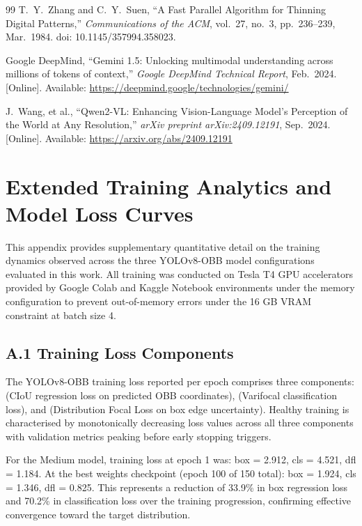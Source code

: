 \documentclass[12pt,a4paper]{report}
\begin{document}
\begin{thebibliography}{99}
T.~Y.~Zhang and C.~Y.~Suen,
``A Fast Parallel Algorithm for Thinning Digital Patterns,''
\textit{Communications of the ACM}, vol.~27, no.~3, pp.~236--239, Mar.~1984.
doi: 10.1145/357994.358023.

Google DeepMind,
``Gemini 1.5: Unlocking multimodal understanding across millions of tokens of context,''
\textit{Google DeepMind Technical Report}, Feb.~2024.
[Online]. Available: \url{https://deepmind.google/technologies/gemini/}

J.~Wang, et al.,
``Qwen2-VL: Enhancing Vision-Language Model's Perception of the World at Any Resolution,''
\textit{arXiv preprint arXiv:2409.12191}, Sep.~2024.
[Online]. Available: \url{https://arxiv.org/abs/2409.12191}

\end{thebibliography}


\appendix
\chapter{Extended Training Analytics and Model Loss Curves}
\label{app:training_analytics}

This appendix provides supplementary quantitative detail on the training dynamics observed across the three YOLOv8-OBB model configurations evaluated in this work. All training was conducted on Tesla T4 GPU accelerators provided by Google Colab and Kaggle Notebook environments under the  memory configuration to prevent out-of-memory errors under the 16 GB VRAM constraint at batch size 4.

\section*{A.1 Training Loss Components}
The YOLOv8-OBB training loss reported per epoch comprises three components:  (CIoU regression loss on predicted OBB coordinates),  (Varifocal classification loss), and  (Distribution Focal Loss on box edge uncertainty). Healthy training is characterised by monotonically decreasing loss values across all three components with validation metrics peaking before early stopping triggers.

For the Medium model, training loss at epoch 1 was: box = 2.912, cls = 4.521, dfl = 1.184. At the best weights checkpoint (epoch 100 of 150 total): box = 1.924, cls = 1.346, dfl = 0.825. This represents a reduction of 33.9\% in box regression loss and 70.2\% in classification loss over the training progression, confirming effective convergence toward the target distribution.
\end{document}
